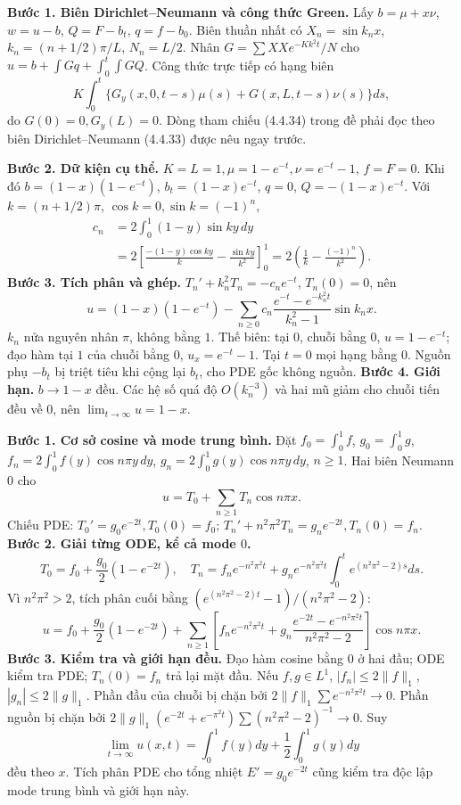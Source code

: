 \textbf{Bước 1. Biên Dirichlet–Neumann và công thức Green.}
Lấy $b=\mu+x\nu$, $w=u-b$, $Q=F-b_t$, $q=f-b_0$. Biên thuần nhất có $X_n=\sin k_nx$, $k_n=(n+1/2)\pi/L$, $N_n=L/2$. Nhân $G=\sum XXe^{-Kk^2t}/N$ cho $u=b+\int Gq+\int_0^t\int GQ$. Công thức trực tiếp có hạng biên
\[K\int_0^t\{G_y(x,0,t-s)\mu(s)+G(x,L,t-s)\nu(s)\}ds,\]
do $G(0)=0,G_y(L)=0$. Dòng tham chiếu (4.4.34) trong đề phải đọc theo biên Dirichlet–Neumann (4.4.33) được nêu ngay trước.

\textbf{Bước 2. Dữ kiện cụ thể.}
$K=L=1,\mu=1-e^{-t},\nu=e^{-t}-1$, $f=F=0$. Khi đó $b=(1-x)(1-e^{-t})$, $b_t=(1-x)e^{-t}$, $q=0$, $Q=-(1-x)e^{-t}$.
Với $k=(n+1/2)\pi$, $\cos k=0,\sin k=(-1)^n$,
\begin{align*}
c_n&=2\int_0^1(1-y)\sin ky\,dy\\
&=2\left[\frac{-(1-y)\cos ky}k-\frac{\sin ky}{k^2}\right]_0^1
=2\left(\frac1k-\frac{(-1)^n}{k^2}\right).
\end{align*}
\textbf{Bước 3. Tích phân và ghép.}
$T_n'+k_n^2T_n=-c_ne^{-t}$, $T_n(0)=0$, nên
\[u=(1-x)(1-e^{-t})
-\sum_{n\ge0}c_n\frac{e^{-t}-e^{-k_n^2t}}{k_n^2-1}\sin k_nx.\]
$k_n$ nửa nguyên nhân $\pi$, không bằng $1$. Thế biên: tại $0$, chuỗi bằng $0$, $u=1-e^{-t}$; đạo hàm tại $1$ của chuỗi bằng $0$, $u_x=e^{-t}-1$. Tại $t=0$ mọi hạng bằng $0$. Nguồn phụ $-b_t$ bị triệt tiêu khi cộng lại $b_t$, cho PDE gốc không nguồn.
\textbf{Bước 4. Giới hạn.} $b\to1-x$ đều. Các hệ số quá độ $O(k_n^{-3})$ và hai mũ giảm cho chuỗi tiến đều về $0$, nên $\lim_{t\to\infty}u=1-x$.

\textbf{Bước 1. Cơ sở cosine và mode trung bình.}
Đặt $f_0=\int_0^1f$, $g_0=\int_0^1g$, $f_n=2\int_0^1f(y)\cos n\pi y\,dy$, $g_n=2\int_0^1g(y)\cos n\pi y\,dy$, $n\ge1$. Hai biên Neumann $0$ cho
\[u=T_0+\sum_{n\ge1}T_n\cos n\pi x.\]
Chiếu PDE: $T_0'=g_0e^{-2t},T_0(0)=f_0$; $T_n'+n^2\pi^2T_n=g_ne^{-2t},T_n(0)=f_n$.
\textbf{Bước 2. Giải từng ODE, kể cả mode $0$.}
\[T_0=f_0+\frac{g_0}2(1-e^{-2t}),\quad
T_n=f_ne^{-n^2\pi^2t}+g_ne^{-n^2\pi^2t}
\int_0^te^{(n^2\pi^2-2)s}ds.\]
Vì $n^2\pi^2>2$, tích phân cuối bằng $(e^{(n^2\pi^2-2)t}-1)/(n^2\pi^2-2)$:
\[u=f_0+\frac{g_0}2(1-e^{-2t})+
\sum_{n\ge1}\left[f_ne^{-n^2\pi^2t}
+g_n\frac{e^{-2t}-e^{-n^2\pi^2t}}{n^2\pi^2-2}\right]\cos n\pi x.\]
\textbf{Bước 3. Kiểm tra và giới hạn đều.}
Đạo hàm cosine bằng $0$ ở hai đầu; ODE kiểm tra PDE; $T_n(0)=f_n$ trả lại mặt đầu. Nếu $f,g\in L^1$, $|f_n|\le2\|f\|_1$, $|g_n|\le2\|g\|_1$. Phần đầu của chuỗi bị chặn bởi $2\|f\|_1\sum e^{-n^2\pi^2t}\to0$. Phần nguồn bị chặn bởi $2\|g\|_1(e^{-2t}+e^{-\pi^2t})\sum(n^2\pi^2-2)^{-1}\to0$. Suy
\[\lim_{t\to\infty}u(x,t)=\int_0^1f(y)dy+\frac12\int_0^1g(y)dy\]
đều theo $x$. Tích phân PDE cho tổng nhiệt $E'=g_0e^{-2t}$ cũng kiểm tra độc lập mode trung bình và giới hạn này.

